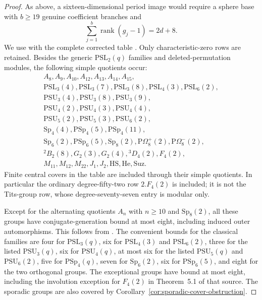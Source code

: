 \documentclass[11pt]{article}
\theoremstyle{definition}
\theoremstyle{remark}
\begin{document}
\begin{proof}
As above, a sixteen-dimensional period image would require a
sphere base with $b\geq19$ genuine coefficient branches and
\[
 \sum_{j=1}^b\operatorname{rank}(g_j-1)=2d+8.
\]
We use \cite[Theorem~1, p.~22; Table~2, p.~31]{HissMalle}
with the complete corrected table
\cite[Table~2, pp.~106--110]{HissMalleCorrection}.
Only characteristic-zero rows are retained. Besides the generic
$\mathrm{PSL}_2(q)$ families and deleted-permutation modules,
the following simple quotients occur:
\[
\begin{gathered}
 A_8,A_9,A_{10},A_{12},A_{13},A_{14},A_{15},\\
 \mathrm{PSL}_3(4),\mathrm{PSL}_3(7),\mathrm{PSL}_3(8),
 \mathrm{PSL}_4(3),\mathrm{PSL}_6(2),\\
 \mathrm{PSU}_3(4),\mathrm{PSU}_3(8),\mathrm{PSU}_3(9),\\
 \mathrm{PSU}_4(2),\mathrm{PSU}_4(3),\mathrm{PSU}_4(4),\\
 \mathrm{PSU}_5(2),\mathrm{PSU}_5(3),\mathrm{PSU}_6(2),\\
 \mathrm{Sp}_4(4),\mathrm{PSp}_4(5),\mathrm{PSp}_4(11),\\
 \mathrm{Sp}_6(2),\mathrm{PSp}_6(5),\mathrm{Sp}_8(2),
 \mathrm{P}\Omega_8^+(2),\mathrm{P}\Omega_8^-(2),\\
 {}^2B_2(8),G_2(3),G_2(4),{}^3D_4(2),F_4(2),\\
 M_{11},M_{12},M_{22},J_1,J_2,\mathrm{HS},\mathrm{He},\mathrm{Suz}.
\end{gathered}
\]
Finite central covers in the table are included through their
simple quotients. In particular the ordinary degree-fifty-two
row $2.F_4(2)$ is included; it is not the Tits-group row, whose
degree-seventy-seven entry is modular only.

Except for the alternating quotients $A_n$ with $n\geq10$
and $\mathrm{Sp}_8(2)$, all these groups have
conjugate-generation bound at most eight, including induced
outer automorphisms. This follows from
\cite[Lemmas~3.1--3.4; Theorems~4.1--4.4 and 5.1;
Proposition~5.7; Lemma~6.1; Table~1, p.~554]{GS}.
The convenient bounds for the classical families are four for
$\mathrm{PSL}_3(q)$, six for $\mathrm{PSL}_4(3)$ and
$\mathrm{PSL}_6(2)$, three for the listed $\mathrm{PSU}_3(q)$,
six for $\mathrm{PSU}_4(q)$, at most six for the listed
$\mathrm{PSU}_5(q)$ and $\mathrm{PSU}_6(2)$, five for
$\mathrm{PSp}_4(q)$, seven for $\mathrm{Sp}_6(2)$, six for
$\mathrm{PSp}_6(5)$, and eight for the two orthogonal groups.
The exceptional groups have bound at most eight, including the
involution exception for $F_4(2)$ in Theorem~5.1 of that source.
The sporadic groups are also covered by
Corollary~\ref{cor:sporadic-cover-obstruction}.


\end{proof}
\end{document}
